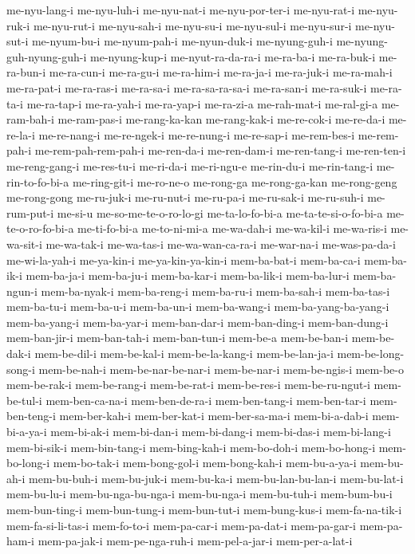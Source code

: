 {me-nyu-lang-i me-nyu-luh-i me-nyu-nat-i me-nyu-por-ter-i me-nyu-rat-i
me-nyu-ruk-i me-nyu-rut-i me-nyu-sah-i me-nyu-su-i me-nyu-sul-i
me-nyu-sur-i me-nyu-sut-i me-nyum-bu-i me-nyum-pah-i me-nyun-duk-i
me-nyung-guh-i me-nyung-guh-nyung-guh-i me-nyung-kup-i me-nyut-ra-da-ra-i
me-ra-ba-i me-ra-buk-i me-ra-bun-i me-ra-cun-i me-ra-gu-i me-ra-him-i
me-ra-ja-i me-ra-juk-i me-ra-mah-i me-ra-pat-i me-ra-ras-i me-ra-sa-i
me-ra-sa-ra-sa-i me-ra-san-i me-ra-suk-i me-ra-ta-i me-ra-tap-i
me-ra-yah-i me-ra-yap-i me-ra-zi-a me-rah-mat-i me-ral-gi-a me-ram-bah-i
me-ram-pas-i me-rang-ka-kan me-rang-kak-i me-re-cok-i me-re-da-i
me-re-la-i me-re-nang-i me-re-ngek-i me-re-nung-i me-re-sap-i me-rem-bes-i
me-rem-pah-i me-rem-pah-rem-pah-i me-ren-da-i me-ren-dam-i me-ren-tang-i
me-ren-ten-i me-reng-gang-i me-res-tu-i me-ri-da-i me-ri-ngu-e me-rin-du-i
me-rin-tang-i me-rin-to-fo-bi-a me-ring-git-i me-ro-ne-o me-rong-ga
me-rong-ga-kan me-rong-geng me-rong-gong me-ru-juk-i me-ru-nut-i
me-ru-pa-i me-ru-sak-i me-ru-suh-i me-rum-put-i me-si-u
me-so-me-te-o-ro-lo-gi me-ta-lo-fo-bi-a me-ta-te-si-o-fo-bi-a
me-te-o-ro-fo-bi-a me-ti-fo-bi-a me-to-ni-mi-a me-wa-dah-i me-wa-kil-i
me-wa-ris-i me-wa-sit-i me-wa-tak-i me-wa-tas-i me-wa-wan-ca-ra-i
me-war-na-i me-was-pa-da-i me-wi-la-yah-i me-ya-kin-i me-ya-kin-ya-kin-i
mem-ba-bat-i mem-ba-ca-i mem-ba-ik-i mem-ba-ja-i mem-ba-ju-i mem-ba-kar-i
mem-ba-lik-i mem-ba-lur-i mem-ba-ngun-i mem-ba-nyak-i mem-ba-reng-i
mem-ba-ru-i mem-ba-sah-i mem-ba-tas-i mem-ba-tu-i mem-ba-u-i mem-ba-un-i
mem-ba-wang-i mem-ba-yang-ba-yang-i mem-ba-yang-i mem-ba-yar-i
mem-ban-dar-i mem-ban-ding-i mem-ban-dung-i mem-ban-jir-i mem-ban-tah-i
mem-ban-tun-i mem-be-a mem-be-ban-i mem-be-dak-i mem-be-dil-i mem-be-kal-i
mem-be-la-kang-i mem-be-lan-ja-i mem-be-long-song-i mem-be-nah-i
mem-be-nar-be-nar-i mem-be-nar-i mem-be-ngis-i mem-be-o mem-be-rak-i
mem-be-rang-i mem-be-rat-i mem-be-res-i mem-be-ru-ngut-i mem-be-tul-i
mem-ben-ca-na-i mem-ben-de-ra-i mem-ben-tang-i mem-ben-tar-i
mem-ben-teng-i mem-ber-kah-i mem-ber-kat-i mem-ber-sa-ma-i mem-bi-a-dab-i
mem-bi-a-ya-i mem-bi-ak-i mem-bi-dan-i mem-bi-dang-i mem-bi-das-i
mem-bi-lang-i mem-bi-sik-i mem-bin-tang-i mem-bing-kah-i mem-bo-doh-i
mem-bo-hong-i mem-bo-long-i mem-bo-tak-i mem-bong-gol-i mem-bong-kah-i
mem-bu-a-ya-i mem-bu-ah-i mem-bu-buh-i mem-bu-juk-i mem-bu-ka-i
mem-bu-lan-bu-lan-i mem-bu-lat-i mem-bu-lu-i mem-bu-nga-bu-nga-i
mem-bu-nga-i mem-bu-tuh-i mem-bum-bu-i mem-bun-ting-i mem-bun-tung-i
mem-bun-tut-i mem-bung-kus-i mem-fa-na-tik-i mem-fa-si-li-tas-i
mem-fo-to-i mem-pa-car-i mem-pa-dat-i mem-pa-gar-i mem-pa-ham-i
mem-pa-jak-i mem-pe-nga-ruh-i mem-pel-a-jar-i mem-per-a-lat-i
}
